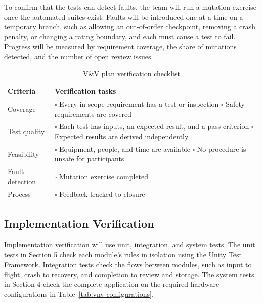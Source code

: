 \documentclass[12pt, titlepage]{article}
\begin{document}
To confirm that the tests can detect faults, the team will run a mutation exercise once
the automated suites exist. Faults will be introduced one at a time on a temporary
branch, such as allowing an out-of-order checkpoint, removing a crash penalty, or
changing a rating boundary, and each must cause a test to fail. Progress will be measured
by requirement coverage, the share of mutations detected, and the number of open review
issues.

\begin{table}[!htbp]
\centering
\caption{V\&V plan verification checklist}
\label{tab:plan-checklist}
\renewcommand{\arraystretch}{1.3}
\begin{tabularx}{\textwidth}{@{}>{\raggedright\arraybackslash}p{}>{\raggedright\arraybackslash}X@{}}
\toprule
\textbf{Criteria} & \textbf{Verification tasks} \\
\midrule
Coverage &
\(\square\) Every in-scope requirement has a test or inspection\newline
\(\square\) Safety requirements are covered \\
Test quality &
\(\square\) Each test has inputs, an expected result, and a pass criterion\newline
\(\square\) Expected results are derived independently \\
Feasibility &
\(\square\) Equipment, people, and time are available\newline
\(\square\) No procedure is unsafe for participants \\
Fault detection &
\(\square\) Mutation exercise completed \\
Process &
\(\square\) Feedback tracked to closure \\
\bottomrule
\end{tabularx}
\end{table}

\subsection{Implementation Verification}

Implementation verification will use unit, integration, and system tests. The unit tests
in Section 5 check each module's rules in isolation using the Unity Test Framework.
Integration tests check the flows between modules, such as input to flight, crash to
recovery, and completion to review and storage. The system tests in Section 4 check the
complete application on the required hardware configurations in
Table~\ref{tab:vnv-configurations}.
\end{document}
